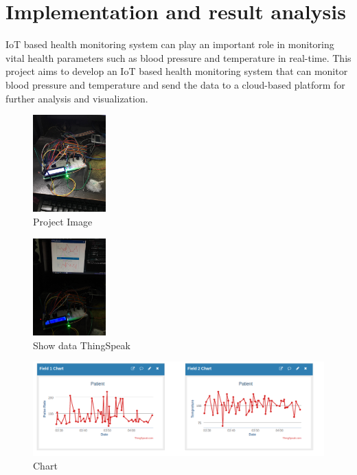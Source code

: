 \documentclass[conference]{IEEEtran}
\begin{document}
\section{Implementation and result analysis}
IoT based health monitoring system can play an important role in monitoring vital health parameters such as blood pressure and temperature in real-time. This project aims to develop an IoT based health monitoring system that can monitor blood pressure and temperature and send the data to a cloud-based platform for further analysis and visualization.\\
\begin{figure}[h]
    \centering
    \includegraphics[width=0.25\textwidth]{project_pic.jpg}
    \caption{Project Image}
    \label{fig:mesh1}
\end{figure}
\begin{figure}[h]
    \centering
    \includegraphics[width=0.25\textwidth]{fullProjectPic.jpg}
    \caption{Show data ThingSpeak }
    \label{fig:mesh1}
\end{figure}

\begin{figure}[h]
    \centering
    \includegraphics[width=.5\textwidth]{chart.png}
    \caption{Chart}
    \label{fig:mesh1}
\end{figure}
\end{document}
